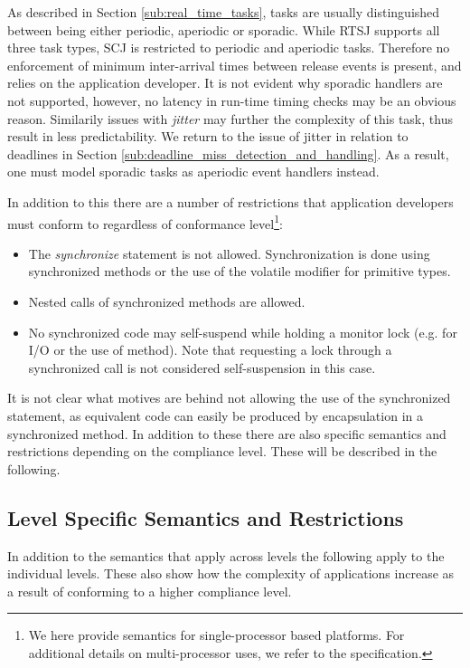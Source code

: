 As described in Section \ref{sub:real_time_tasks}, tasks are usually distinguished between being either periodic, aperiodic or sporadic. While RTSJ supports all three task types, SCJ is restricted to periodic and aperiodic tasks. Therefore no enforcement of minimum inter-arrival times between release events is present, and relies on the application developer. It is not evident why sporadic handlers are not supported, however, no latency in run-time timing checks may be an obvious reason. Similarily issues with \textit{jitter} may further the complexity of this task, thus result in less predictability. We return to the issue of jitter in relation to deadlines in Section \ref{sub:deadline_miss_detection_and_handling}. As a result, one must model sporadic tasks as aperiodic event handlers instead.

In addition to this there are a number of restrictions that application developers must conform to regardless of conformance level\footnote{We here provide semantics for single-processor based platforms. For additional details on multi-processor uses, we refer to the specification.}:
\begin{itemize}
	\item The \textit{synchronize} statement is not allowed. Synchronization is done using synchronized methods or the use of the volatile modifier for primitive types.
	\item Nested calls of synchronized methods are allowed.
	\item No synchronized code may self-suspend while holding a monitor lock (e.g. for I/O or the use of  method). Note that requesting a lock through a synchronized call is not considered self-suspension in this case.
\end{itemize}

It is not clear what motives are behind not allowing the use of the synchronized statement, as equivalent code can easily be produced by encapsulation in a synchronized method.
In addition to these there are also specific semantics and restrictions depending on the compliance level. These will be described in the following.


\subsection{Level Specific Semantics and Restrictions} %
\label{sub:level_specific_restrictions}
In addition to the semantics that apply across levels the following apply to the individual levels. These also show how the complexity of applications increase as a result of conforming to a higher compliance level.

